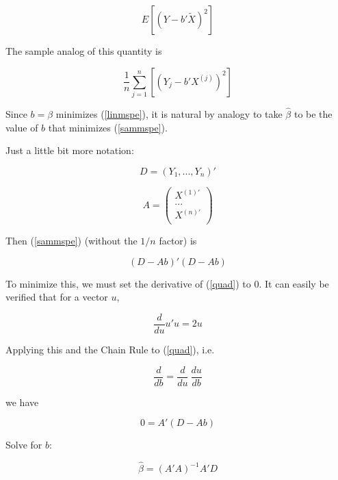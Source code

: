 \begin{equation}
\label{linmspe}
E \left [ (Y - b' \widetilde{X})^2 \right ]
\end{equation}

The sample analog of this quantity is

\begin{equation}
\label{sammspe}
\frac{1}{n}
\sum_{j=1}^n \left [ (Y_j - b' X^{(j)})^2 \right ]
\end{equation}

Since $b = \beta$ minimizes (\ref{linmspe}), it is natural by analogy to
take $\widehat{\beta}$ to be the value of $b$ that minimizes
(\ref{sammspe}).

Just a little bit more notation:

\begin{equation}
D = (Y_1,...,Y_n)'
\end{equation}

\begin{equation}
A = 
\left (
\begin{array}{r}
X^{(1)'} \\
... \\
X^{(n)'} \\
\end{array}
\right )
\end{equation}

Then (\ref{sammspe}) (without the $1/n$ factor) is

\begin{equation}
\label{quad}
(D - Ab)'(D - Ab)
\end{equation}

To minimize this, we must set the derivative of (\ref{quad}) to 0.  It
can easily be verified that for a vector $u$, 

\begin{equation}
\frac{d}{du} u'u = 2u
\end{equation}

Applying this and the Chain Rule to (\ref{quad}), i.e.

\begin{equation}
\frac{d}{db} = \frac{d}{du} ~ \frac{du}{db}
\end{equation}


we have

\begin{equation}
0 = A' (D - Ab) 
\end{equation}

Solve for $b$:

\begin{equation}
\widehat{\beta} = (A'A)^{-1} A'D
\end{equation}


